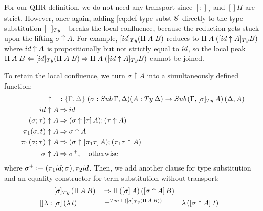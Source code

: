 \documentclass[a4paper,UKenglish,numberwithinsect,cleveref,thm-restate]{lipics-v2021}
\begin{document}
For our QIIR definition, %
we do not need any transport since $[;]_T$ and $[]\Pi$ are strict.
However, once again, adding \eqref{eq:def-type-subst-8} directly to the type substitution $[\blank]_{\Ty}\blank$ breaks the local confluence, because the reduction gets stuck upon the lifting $\sigma \uparrow A$.
For example, $[\idS]_{\Ty}(\Pi\;A\;B)$ reduces to $\Pi\;A\;([\idS \uparrow A]_{\Ty}B)$ where $\idS \uparrow A$ is propositionally but not strictly equal to $\idS$, so the local peak $\Pi\;A\;B \Leftarrow [\idS]_{\Ty}(\Pi\;A\;B) \reduce \Pi\;A\;([\idS \uparrow A]_{\Ty}B)$ cannot be joined. 

To retain the local confluence, we turn $\sigma \uparrow A$ into a simultaneously defined function:
\begin{alignat}{3}
  \blank\uparrow \blank & : \implicit{\Gamma, \Delta}\; (\sigma : \Sub\,\Gamma,\Delta) (A : \Ty\,\Delta) \to \Sub\,(\Gamma, [\sigma]_{\Ty}\,A)\, (\Delta, A) \label{eq:type-of-lifting} \\
\idS                \uparrow A & \reduce \idS \nonumber \\
(\sigma ; \tau)     \uparrow A & \reduce (\sigma \uparrow \sub{\tau}{A} ) ; (\tau \uparrow A) \nonumber \\
\pi_1(\sigma, t)    \uparrow A & \reduce \sigma \uparrow A \nonumber \\
\pi_1(\sigma; \tau) \uparrow A & \reduce (\sigma \uparrow \sub{\pi_1 \tau}{A}) ; (\pi_1 \tau \uparrow A)\nonumber \\
\sigma              \uparrow A & \reduce \sigma^+ , \quad \text{otherwise} \nonumber
\end{alignat}
where $\sigma^+ \defeq (\pi_1\idS ; \sigma), \pi_2\idS$.
Then, we add another clause for type substitution and an equality constructor for term substitution without transport:
\begin{alignat}{5}
                     & [ \sigma ]_{\Ty}\,(\Pi\,A\,B) && \reduce \Pi\,(\sub{\sigma}{A})\,(\sub{\sigma\uparrow A}{B}) \label{eq:def-type-subst-9} \\
  \mathsf{[]\lambda} :{} & [\sigma]\, (\lambda\,t) && =^{\Tm\,\Gamma\,([\sigma]_{\Ty}(\Pi\,A\,B))} && \lambda\,([\sigma \uparrow A]\,\,t) \nonumber
\end{alignat}
\end{document}

